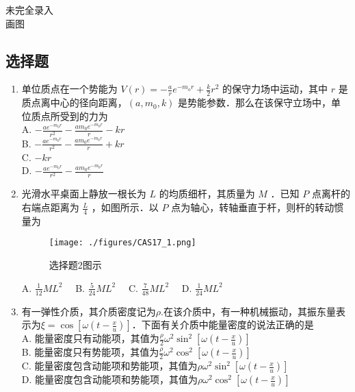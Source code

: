 
\begin{issues}
\issueTODO
未完全录入
\\ 画图

\end{issues}



\subsection{选择题}
\begin{enumerate}
\item 单位质点在一个势能为 $V(r) = -\frac{a}{r}e^{-m_{o}r}+\frac{k}{2}r^{2}$ 的保守力场中运动，其中 $r$ 是质点离中心的径向距离，$(a,m_{0},k)$ 是势能参数．那么在该保守立场中，单位质点所受到的力为\\
A. $-\frac{ae^{-m_{0}r}}{r^{2}}-\frac{am_{0}e^{-m_{0}r}}{r}-kr$\\
B. $-\frac{ae^{-m_{0}r}}{r^{2}}-\frac{am_{0}e^{-m_{0}r}}{r}+kr$\\
C. $-kr$\\
D. $-\frac{ae^{-m_{0}r}}{r^{2}}-\frac{am_{0}e^{-m_{0}r}}{r}$\\

\item 光滑水平桌面上静放一根长为 $L$ 的均质细杆，其质量为 $M$ ．已知 $P$ 点离杆的右端点距离为 $\frac{L}{4}$ ，如图所示．以 $P$ 点为轴心，转轴垂直于杆，则杆的转动惯量为\\
\begin{figure}[ht]
\centering
\texttt{[image: ./figures/CAS17\_1.png]}
\caption{选择题2图示} \label{CAS17_fig1}
\end{figure}
A. $\frac{1}{12}ML^{2} \quad$
B. $\frac{5}{24}ML^{2} \quad$
C. $\frac{7}{48}ML^{2} \quad$
D. $\frac{1}{24}ML^{2} \quad$

\item 有一弹性介质，其介质密度记为$\rho$.在该介质中，有一种机械振动，其振东量表示为$\xi = \cos{[\omega(t-\frac{x}{u})]}$．下面有关介质中能量密度的说法正确的是\\
A. 能量密度只有动能项，其值为$\frac{\rho}{2}\omega^{2}\sin^{2}{[\omega(t-\frac{x}{u})]}$\\
B. 能量密度只有势能项，其值为$\frac{\rho}{2}\omega^{2}\cos^{2}{[\omega(t-\frac{x}{u})]}$\\
C. 能量密度包含动能项和势能项，其值为$\rho\omega^{2}\sin^{2}{[\omega(t-\frac{x}{u})]}$\\
D. 能量密度包含动能项和势能项，其值为$\rho\omega^{2}\cos^{2}{[\omega(t-\frac{x}{u})]}$\\


\end{enumerate}
